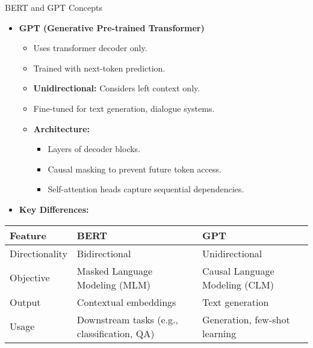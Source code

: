 \begin{frame}[allowframebreaks]{BERT and GPT Concepts}
    \begin{itemize}
        \item \textbf{GPT (Generative Pre-trained Transformer)}
        \begin{itemize}
            \item Uses transformer decoder only.
            \item Trained with next-token prediction.
            \item \textbf{Unidirectional:} Considers left context only.
            \item Fine-tuned for text generation, dialogue systems.
            \item \textbf{Architecture:}
            \begin{itemize}
                \item Layers of decoder blocks.
                \item Causal masking to prevent future token access.
                \item Self-attention heads capture sequential dependencies.
            \end{itemize}
        \end{itemize}
    \end{itemize}
\framebreak
    \begin{itemize}
        \item \textbf{Key Differences:}
    \end{itemize}
    \begin{table}[h!]
        \centering
        \renewcommand{\arraystretch}{1.8}
        \begin{tabular}{@{} p{} p{} p{} @{}}
            \hline
            \textbf{Feature} & \textbf{BERT} & \textbf{GPT} \\
            \hline
            Directionality & Bidirectional & Unidirectional \\
            Objective & Masked Language Modeling (MLM) & Causal Language Modeling (CLM) \\
            Output & Contextual embeddings & Text generation \\
            Usage & Downstream tasks (e.g., classification, QA) & Generation, few-shot learning \\
            \hline
        \end{tabular}
    \end{table}
\end{frame}